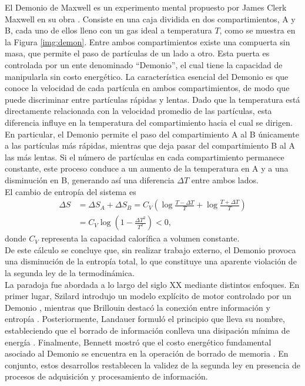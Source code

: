 El Demonio de Maxwell es un experimento mental propuesto por James Clerk Maxwell en su obra \cite{Maxwell_1871}. Consiste en una caja dividida en dos compartimientos, A y B, cada uno de ellos lleno con un gas ideal a temperatura $T$, como se muestra en la Figura \ref{img:demon}. Entre ambos compartimientos existe una compuerta sin masa, que permite el paso de partículas de un lado a otro. Esta puerta es controlada por un ente denominado ``Demonio'', el cual tiene la capacidad de manipularla sin costo energético. La característica esencial del Demonio es que conoce la velocidad de cada partícula en ambos compartimientos, de modo que puede discriminar entre partículas rápidas y lentas. Dado que la temperatura está directamente relacionada con la velocidad promedio de las partículas, esta diferencia influye en la temperatura del compartimiento hacia el cual se dirigen. En particular, el Demonio permite el paso del compartimiento A al B únicamente a las partículas más rápidas, mientras que deja pasar del compartimiento B al A las más lentas. Si el número de partículas en cada compartimiento permanece constante, este proceso conduce a un aumento de la temperatura en A y a una disminución en B, generando así una diferencia $\Delta T$ entre ambos lados.
\\

El cambio de entropía del sistema es
\begin{align*}
    \Delta S & = \Delta S_{A} + \Delta S_{B} = C_{V}\left( \log \frac{T-\Delta T}{T} + \log \frac{T+\Delta T}{T} \right) \\
       & =  C_{V} \log \left( 1 - \frac{\Delta T^{2}}{T^{2}}  \right) < 0,
\end{align*}
donde \( C_V \) representa la capacidad calorífica a volumen constante.
\\

De este cálculo se concluye que, sin realizar trabajo externo, el Demonio provoca una disminución de la entropía total, lo que constituye una aparente violación de la segunda ley de la termodinámica.
\\

La paradoja fue abordada a lo largo del siglo XX mediante distintos enfoques. En primer lugar, Szilard introdujo un modelo explícito de motor controlado por un Demonio \cite{szilard1964decrease}, mientras que Brillouin destacó la conexión entre información y entropía \cite{brillouin1951maxwell}. Posteriormente, Landauer formuló el principio que lleva su nombre, estableciendo que el borrado de información conlleva una disipación mínima de energía \cite{Landauer_1961}. Finalmente, Bennett mostró que el costo energético fundamental asociado al Demonio se encuentra en la operación de borrado de memoria \cite{bennett1982thermodynamics}. En conjunto, estos desarrollos restablecen la validez de la segunda ley en presencia de procesos de adquisición y procesamiento de información.
\\

